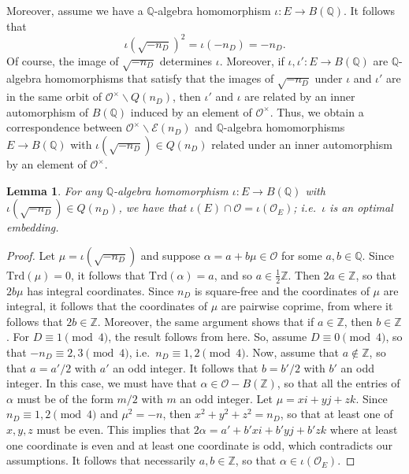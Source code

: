 \documentclass[11pt]{amsart}
\newcommand{\bigo}{\mathcal{O}}
\newcommand{\Z}{\mathbb{Z}}
\newcommand{\Q}{\mathbb{Q}}
\newcommand{\trd}[1]{\mathrm{Trd}\left(#1\right)}
\newtheorem{lemma}[theorem]{Lemma}
\theoremstyle{definition}
\theoremstyle{remark}
\begin{document}
Moreover, assume we have a $\Q$-algebra homomorphism $\iota : E \rightarrow B(\Q)$. It follows that $$\iota(\sqrt{-n_D})^2 = \iota(-n_D)=-n_D.$$ Of course, the image of $\sqrt{-n_D}$ determines $\iota$. Moreover, if $\iota, \iota' : E\rightarrow B(\Q)$ are $\Q$-algebra homomorphisms that satisfy that the images of $\sqrt{-n_D}$ under $\iota$ and $\iota'$ are in the same orbit of $\bigo^{\times} \backslash Q(n_D)$, then $\iota'$ and $\iota$ are related by an inner automorphism of $B(\Q)$ induced by an element of $\bigo^{\times}$. Thus, we obtain a correspondence between $\bigo^{\times} \backslash \mathcal{E}(n_D)$ and $\Q$-algebra homomorphisms $E \rightarrow B(\Q)$ with $\iota(\sqrt{-n_D})\in Q(n_D)$ related under an inner automorphism by an element of $\bigo^{\times}$.

\begin{lemma}\label{iotaOptEmb}
For any $\Q$-algebra homomorphism $\iota : E \rightarrow B(\Q)$ with $\iota(\sqrt{-n_D})\in Q(n_D)$, we have that $\iota(E) \cap \bigo = \iota(\bigo_E)$; i.e.~$\iota$ is an optimal embedding.
\end{lemma}

\begin{proof}
Let $\mu = \iota(\sqrt{-n_D})$ and suppose $\alpha = a+b\mu \in \bigo$ for some $a,b\in \Q$. Since $\trd{\mu}=0$, it follows that $\trd{\alpha}=a$, and so $a \in \frac{1}{2} \Z$. Then $2a\in \Z$, so that $2b\mu$ has integral coordinates. Since $n_D$ is square-free and the coordinates of $\mu$ are integral, it follows that the coordinates of $\mu$ are pairwise coprime, from where it follows that $2b\in \Z$. Moreover, the same argument shows that if $a\in \Z$, then $b\in \Z$. For $D\equiv 1\pmod{4}$, the result follows from here. So, assume $D\equiv 0\pmod{4}$, so that $-n_D\equiv 2,3\pmod{4}$, i.e.~$n_D\equiv 1,2\pmod{4}$. Now, assume that $a\notin \Z$, so that $a=a'/2$ with $a'$ an odd integer. It follows that $b=b'/2$ with $b'$ an odd integer. In this case, we must have that $\alpha \in \bigo - B(\Z)$, so that all the entries of $\alpha$ must be of the form $m/2$ with $m$ an odd integer. Let $\mu = xi+yj+zk$. Since $n_D\equiv 1,2\pmod{4}$ and $\mu^2=-n$, then $x^2+y^2+z^2=n_D$, so that at least one of $x,y,z$ must be even. This implies that $2\alpha = a' + b'xi + b'yj + b'zk$ where at least one coordinate is even and at least one coordinate is odd, which contradicts our assumptions. It follows that necessarily $a,b\in \Z$, so that $\alpha \in \iota(\bigo_E)$.
\end{proof}
\end{document}
